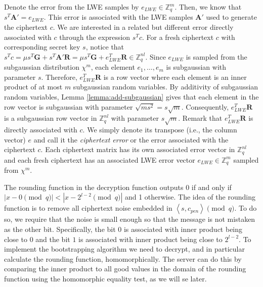Denote the error from the LWE samples by $e_{LWE} \in \mathbb{Z}_q^m$. Then, we know that $s^T\mathbf{A}' = e_{LWE}$. This error is associated with the LWE samples $\mathbf{A}'$ used to generate the ciphertext $c$. We are interested in a related but different error directly associated with $c$ through the expression $s^Tc$.
For a fresh ciphertext $c$ with corresponding secret key $s$, notice that $s^Tc = \mu s^T\mathbf{G} + s^T\mathbf{A}'\mathbf{R} = \mu s^T\mathbf{G} + e_{LWE}^T\mathbf{R} \in \mathbb{Z}_q^{nl}$. Since $e_{LWE}$ is sampled from the subgaussian distribution $\chi^m$, each element $e_1, \dots, e_m$ is subgaussian with parameter $s$. Therefore, $e_{LWE}^T\mathbf{R}$ is a row vector where each element is an inner product of at most $m$ subgaussian random variables. By additivity of subgaussian random variables, Lemma \ref{lemma:add-subgaussian} gives that each element in the row vector is subgaussian with parameter $\sqrt{ms^2} = s\sqrt{m}$. Consequently, $e_{LWE}^T\mathbf{R}$ is a subgaussian row vector in $\mathbb{Z}_q^{nl}$ with parameter $s\sqrt{m}$. Remark that $e_{LWE}^T\mathbf{R}$ is directly associated with $c$. We simply denote its transpose (i.e., the column vector) $e$ and call it the \textit{ciphertext error} or the error associated with the ciphertext $c$. Each ciphertext matrix has its own associated error vector in $\mathbb{Z}_q^{nl}$ and each fresh ciphertext has an associated LWE error vector $e_{LWE} \in \mathbb{Z}_q^{m}$ sampled from $\chi^m$. 

The rounding function in the decryption function outputs $0$ if and only if $|x - 0 \pmod q| < |x - 2^{l-2} \pmod q|$ and 1 otherwise. The idea of the rounding function is to remove all ciphertext noise embedded in $\left \langle s,c_{pen} \right \rangle \pmod q$. To do so, we require that the noise is small enough so that the message is not mistaken as the other bit. Specifically, the bit $0$ is associated with inner product being close to $0$ and the bit $1$ is associated with inner product being close to $2^{l-2}$. To implement the bootstrapping algorithm we need to decrypt, and in particular calculate the rounding function, homomorphically. The server can do this by comparing the inner product to all good values in the domain of the rounding function using the homomorphic equality test, as we will se later.

